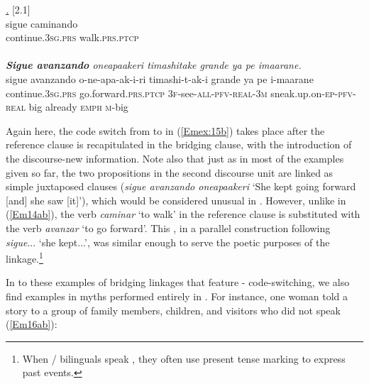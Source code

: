 \documentclass[output=paper]{LSP/langsci}
\begin{document}
\begin{exe}
\ex \label{Em15ab}
\begin{xlist}
\ex \label{Emex:15a}
\glt \textit{\underline{.}} [2.1]\\
\gll sigue caminando\\
 continue\textsc{.3sg.prs} walk\textsc{.prs.ptcp}\\
\glt {}\\
\ex \label{Emex:15b}
\glt \textit{\textbf{Sigue avanzando} oneapaakeri timashitake grande ya pe imaarane.}\\
\gll sigue avanzando o-ne-apa-ak-i-ri timashi-t-ak-i grande ya pe i-maarane\\     	      
    continue\textsc{.3sg.prs} go.forward\textsc{.prs.ptcp} \textsc{3f-}see\textsc{-all-pfv-real-3m} sneak.up.on\textsc{-ep-pfv-real} big already \textsc{emph} \textsc{m-}big\\
\glt {}
\end{xlist}
\end{exe}


Again here, the code switch from  to  in (\ref{Emex:15b}) takes place after the reference clause is recapitulated in the bridging clause, with the introduction of the discourse-new information. Note also that just as in most of the  examples given so far, the two propositions in the second discourse unit are linked as simple juxtaposed clauses (\textit{sigue avanzando oneapaakeri} `She kept going forward [and] she saw [it]'), which would be considered unusual in . However, unlike in (\ref{Em14ab}), the verb \textit{caminar} `to walk' in the reference clause is substituted with the verb \textit{avanzar} `to go forward'. This , in a parallel construction following \textit{sigue}... `she kept...', was similar enough to serve the poetic purposes of the linkage.\footnote{When / bilinguals speak , they often use present tense marking to express past events.}
 
 
In  to these examples of bridging linkages that feature - code-switching, we also find examples in myths performed entirely in . For instance, one woman told a story to a group of family members, children, and visitors who did not speak  (\ref{Em16ab}):
\end{document}
